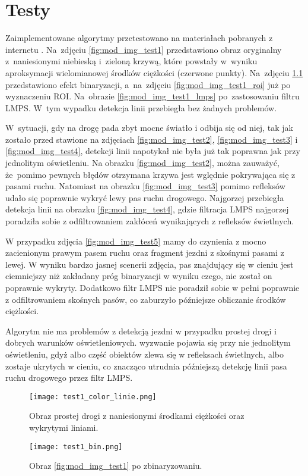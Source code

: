 \chapter{Testy}

Zaimplementowane algorytmy przetestowano na materiałach pobranych z internetu \cite{Geiger2013IJRR}.
Na~zdjęciu \ref{fig:mod_img_test1} przedstawiono obraz oryginalny z~naniesionymi niebieską i~zieloną krzywą, które powstały w~wyniku aproksymacji wielomianowej środków ciężkości (czerwone punkty).
Na~zdjęciu \ref{fig:mod_img_test1_bin} przedstawiono efekt binaryzacji, a~na~zdjęciu \ref{fig:mod_img_test1_roi} już po wyznaczeniu ROI. Na~obrazie \ref{fig:mod_img_test1_lmps} po~zastosowaniu filtru LMPS. W~tym wypadku detekcja linii przebiegła bez żadnych problemów.

W~sytuacji, gdy na drogę pada zbyt mocne światło i odbija się od niej, tak jak zostało przed stawione na zdjęciach \ref{fig:mod_img_test2}, \ref{fig:mod_img_test3} i \ref{fig:mod_img_test4}, detekcji linii napotykał nie była już tak poprawna jak przy jednolitym oświetleniu.
Na obrazku \ref{fig:mod_img_test2}, można zauważyć, że~pomimo pewnych błędów otrzymana krzywa jest wględnie pokrywająca się z  pasami ruchu. Natomiast na obrazku \ref{fig:mod_img_test3} pomimo refleksów udało się poprawnie wykryć lewy pas ruchu drogowego.
Najgorzej przebiegła detekcja linii na obrazku \ref{fig:mod_img_test4}, gdzie filtracja LMPS najgorzej poradziła sobie z odfiltrowaniem zakłóceń wynikających z refleksów świetlnych.

W przypadku zdjęcia \ref{fig:mod_img_test5} mamy do czynienia z mocno zacienionym prawym pasem ruchu oraz fragment jezdni z skośnymi pasami z lewej. W wyniku bardzo jasnej scenerii zdjęcia, pas znajdujący się w cieniu jest ciemniejszy niż zakładany próg binaryzacji w wyniku czego, nie został on poprawnie wykryty. Dodatkowo filtr LMPS nie poradził sobie w pełni poprawnie z odfiltrowaniem skośnych pasów, co zaburzyło późniejsze obliczanie środków ciężkości.

Algorytm nie ma problemów z detekcją jezdni w przypadku prostej drogi i dobrych warunków oświetleniowych.
wyzwanie pojawia się przy nie jednolitym oświetleniu, gdyż albo część obiektów zlewa się w refleksach świetlnych, albo zostaje ukrytych w cieniu, co znacząco utrudnia późniejszą detekcję linii pasa ruchu drogowego przez filtr LMPS.

\begin{figure}[h]
	\begin{minipage}{0.48\textwidth}
		\centering
		\texttt{[image: test1\_color\_linie.png]}
		\caption{Obraz prostej drogi z naniesionymi środkami ciężkości oraz wykrytymi liniami.}
		\label{fig:mod_img_test1}
	\end{minipage}
	\begin{minipage}{0.48\textwidth}
		\centering
		\texttt{[image: test1\_bin.png]}
		\caption{Obraz \ref{fig:mod_img_test1} po zbinaryzowaniu.}
		\label{fig:mod_img_test1_bin}
	\end{minipage}
\end{figure}

